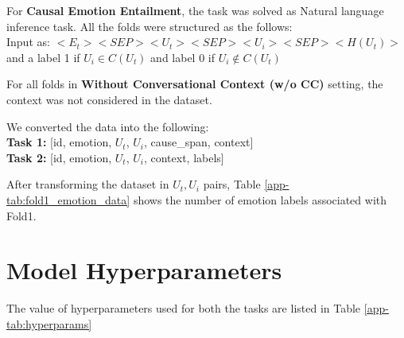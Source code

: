 \documentclass{article}
\begin{document}
For \textbf{Causal Emotion Entailment}, the task was solved as Natural language inference task. All the folds were structured as the 
follows:\\
Input as: \textit{$<E_t> <SEP> <U_t> <SEP> <U_i> <SEP> <H(U_t)>$}
and a label 1 if $U_i \in C(U_t)$ and label 0 if $U_i \notin C(U_t)$

For all folds in \textbf{Without Conversational Context (w/o CC)} setting, the context was not considered in the dataset.

\noindent We converted the data into the following:\\
\textbf{Task 1:} [id, emotion, $U_t$, $U_i$, cause\_span, context]\\
\textbf{Task 2:} [id, emotion, $U_t$, $U_i$, context, labels]

After transforming the dataset in $U_t, U_i$ pairs, Table \ref{app-tab:fold1_emotion_data} shows the number of emotion labels associated with Fold1.


\section{Model Hyperparameters} \label{app:hyperparams}

The value of hyperparameters used for both the tasks are listed in Table \ref{app-tab:hyperparams}
\end{document}
